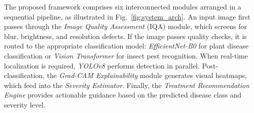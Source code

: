 \documentclass[conference]{IEEEtran}
\begin{document}
The proposed framework comprises six interconnected modules arranged in a sequential pipeline, as illustrated in Fig.~\ref{fig:system_arch}. An input image first passes through the \textit{Image Quality Assessment} (IQA) module, which screens for blur, brightness, and resolution defects. If the image passes quality checks, it is routed to the appropriate classification model: \textit{EfficientNet-B0} for plant disease classification or \textit{Vision Transformer} for insect pest recognition. When real-time localization is required, \textit{YOLOv8} performs detection in parallel. Post-classification, the \textit{Grad-CAM Explainability} module generates visual heatmaps, which feed into the \textit{Severity Estimator}. Finally, the \textit{Treatment Recommendation Engine} provides actionable guidance based on the predicted disease class and severity level.
\end{document}
